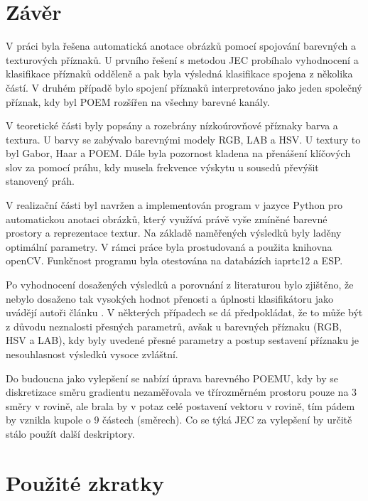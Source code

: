 \documentclass[czech,BP]{thesiskiv}
\begin{document}
\chapter{Závěr}
\par V práci byla řešena automatická anotace obrázků pomocí spojování barevných a texturových příznaků. U prvního řešení s metodou JEC probíhalo vyhodnocení a klasifikace příznaků odděleně a pak byla výsledná klasifikace spojena z několika částí. V druhém případě bylo spojení příznaků interpretováno jako jeden společný příznak, kdy byl POEM rozšířen na všechny barevné kanály.
\par V teoretické části byly popsány a rozebrány nízkoúrovňové příznaky barva a textura. U barvy se zabývalo barevnými modely RGB, LAB a HSV. U textury to byl Gabor, Haar a POEM. Dále byla pozornost kladena na přenášení klíčových slov za pomocí práhu, kdy musela frekvence výskytu u sousedů převýšit stanovený práh. 
\par V realizační části byl navržen a implementován program v jazyce Python pro automatickou anotaci obrázků, který využívá právě vyše zmíněné barevné prostory a reprezentace textur. Na základě naměřených výsledků byly laděny optimální parametry. V rámci práce byla prostudovaná a použita knihovna openCV. Funkčnost programu byla otestována na databázích iaprtc12 a ESP.
\par Po vyhodnocení dosažených výsledků a porovnání z literaturou bylo zjištěno, že nebylo dosaženo tak vysokých hodnot přenosti a úplnosti klasifikátoru jako uvádějí autoři článku \citep{JEC2}. V některých případech se dá předpokládat, že to může být z důvodu neznalosti přesných parametrů, avšak u barevných příznaku (RGB, HSV a LAB), kdy byly uvedené přesné parametry a postup sestavení příznaku je nesouhlasnost výsledků vysoce zvláštní. 
\par Do budoucna jako vylepšení se nabízí úprava barevného POEMU, kdy by se diskretizace směru gradientu nezaměřovala ve třírozměrném prostoru pouze na 3 směry v rovině, ale brala by v potaz celé postavení vektoru v rovině, tím pádem by vznikla kupole o 9 částech (směrech). Co se týká JEC za vylepšení by určitě stálo použít další deskriptory. 

% 
%

\chapter{Použité zkratky}
\end{document}

